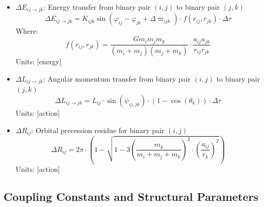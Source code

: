 \documentclass{article}
\begin{document}
\begin{itemize}
\item $\Delta E_{ij \to jk}$: Energy transfer from binary pair $(i,j)$ to binary pair $(j,k)$
    \begin{equation}
    \Delta E_{ij \to jk} = K_{ijk} \sin(\varphi_{ij} - \varphi_{jk} + \Delta\varpi_{ijk}) \cdot f(r_{ij}, r_{jk}) \cdot \Delta\tau
    \end{equation}
    Where:
    \begin{equation}
    f(r_{ij}, r_{jk}) = \frac{G m_i m_j m_k}{(m_i+m_j)(m_j+m_k)} \cdot \frac{a_{ij}a_{jk}}{r_{ij}r_{jk}}
    \end{equation}
    Units: [energy]
    
\item $\Delta L_{ij \to jk}$: Angular momentum transfer from binary pair $(i,j)$ to binary pair $(j,k)$
    \begin{equation}
    \Delta L_{ij \to jk} = L_{ij} \cdot \sin(\psi_{ij,jk}) \cdot (1-\cos(\theta_k)) \cdot \Delta\tau
    \end{equation}
    Units: [action]
    
\item $\Delta R_{ij}$: Orbital precession residue for binary pair $(i,j)$
    \begin{equation}
    \Delta R_{ij} = 2\pi \cdot (1 - \sqrt{1-3\left(\frac{m_k}{m_i+m_j+m_k}\right)^2 \cdot \left(\frac{a_{ij}}{r_k}\right)^2})
    \end{equation}
    Units: [action]
\end{itemize}

\subsection{Coupling Constants and Structural Parameters}
\end{document}
